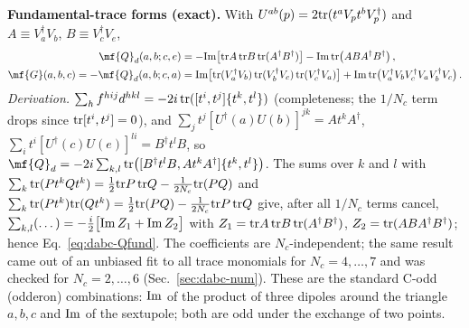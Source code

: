 \noindent\textbf{Fundamental-trace forms (exact).} With $U^{ab}(p)=2{\rm tr}(t^{a}V_{p}t^{b}V_{p}^{\dagger})$ and $A\equiv V_{a}^{\dagger}V_{b}$, $B\equiv V_{c}^{\dagger}V_{e}$,
\begin{align}
\mf{Q}_{d}(a,b;c,e)&=-{\rm Im}\big[{\rm tr}A\,{\rm tr}B\,{\rm tr}(A^{\dagger}B^{\dagger})\big]-{\rm Im}\,{\rm tr}\big(ABA^{\dagger}B^{\dagger}\big)\,,\label{eq:dabc-Qfund}\\
\mf{G}(a,b,c)=-\mf{Q}_{d}(a,b;c,a)&={\rm Im}\big[{\rm tr}(V_{a}^{\dagger}V_{b})\,{\rm tr}(V_{b}^{\dagger}V_{c})\,{\rm tr}(V_{c}^{\dagger}V_{a})\big]+{\rm Im}\,{\rm tr}\big(V_{a}^{\dagger}V_{b}V_{c}^{\dagger}V_{a}V_{b}^{\dagger}V_{c}\big)\,.\label{eq:dabc-Gfund}
\end{align}
\emph{Derivation.} $\sum_{h}f^{hij}d^{hkl}=-2i\,{\rm tr}([t^{i},t^{j}]\{t^{k},t^{l}\})$ (completeness; the $1/N_{c}$ term drops since ${\rm tr}[t^{i},t^{j}]=0$), and $\sum_{j}t^{j}[U^{\dagger}(a)U(b)]^{jk}=At^{k}A^{\dagger}$, $\sum_{i}t^{i}[U^{\dagger}(c)U(e)]^{li}=B^{\dagger}t^{l}B$, so $\mf{Q}_{d}=-2i\sum_{k,l}{\rm tr}\big([B^{\dagger}t^{l}B,At^{k}A^{\dagger}]\{t^{k},t^{l}\}\big)$. The sums over $k$ and $l$ with $\sum_{k}{\rm tr}(Pt^{k}Qt^{k})=\frac12{\rm tr}P\,{\rm tr}Q-\frac{1}{2N_{c}}{\rm tr}(PQ)$ and $\sum_{k}{\rm tr}(Pt^{k}){\rm tr}(Qt^{k})=\frac12{\rm tr}(PQ)-\frac{1}{2N_{c}}{\rm tr}P\,{\rm tr}Q$ give, after all $1/N_{c}$ terms cancel, $\sum_{k,l}(\dots)=-\frac{i}{2}\big[{\rm Im}\,Z_{1}+{\rm Im}\,Z_{2}\big]$ with $Z_{1}={\rm tr}A\,{\rm tr}B\,{\rm tr}(A^{\dagger}B^{\dagger})$, $Z_{2}={\rm tr}(ABA^{\dagger}B^{\dagger})$; hence Eq.~\eqref{eq:dabc-Qfund}. The coefficients are $N_{c}$-independent; the same result came out of an unbiased fit to all trace monomials for $N_{c}=4,\dots,7$ and was checked for $N_{c}=2,\dots,6$ (Sec.~\ref{sec:dabc-num}). These are the standard C-odd (odderon) combinations: ${\rm Im}$ of the product of three dipoles around the triangle $a,b,c$ and ${\rm Im}$ of the sextupole; both are odd under the exchange of two points.


